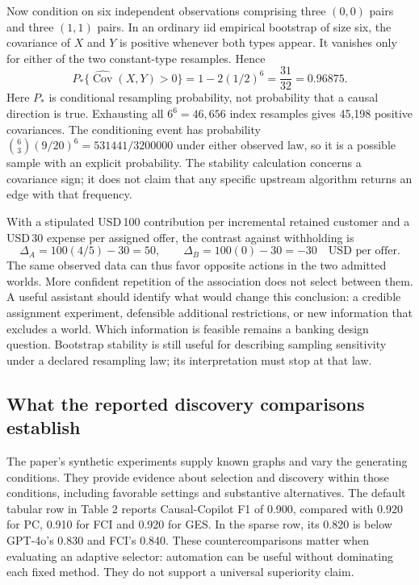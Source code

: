 Now condition on six independent observations comprising three $(0,0)$ pairs
and three $(1,1)$ pairs. In an ordinary iid empirical bootstrap of size six,
the covariance of $X$ and $Y$ is positive whenever both types appear.
It vanishes only for either of the two constant-type resamples. Hence
\begin{equation}
 P_*\{\widehat{\operatorname{Cov}}(X,Y)>0\}
 =1-2(1/2)^6=\frac{31}{32}=0.96875.
 \label{exec17:copilot-stability}
\end{equation}
Here $P_*$ is conditional resampling probability, not probability that a causal
direction is true. Exhausting all $6^6=46{,}656$ index resamples gives 45,198
positive covariances. The conditioning event has probability
$\binom63(9/20)^6=531441/3200000$ under either observed law, so it is a possible
sample with an explicit probability. The stability calculation concerns a
covariance sign; it does not claim that any specific upstream algorithm returns
an edge with that frequency.~\citep{exec17_copilot_exact}

With a stipulated USD\,100 contribution per incremental retained customer and
a USD\,30 expense per assigned offer, the contrast against withholding is
\begin{equation}
 \Delta_A=100(4/5)-30=50,\qquad
 \Delta_B=100(0)-30=-30\quad\text{USD per offer}.
 \label{exec17:copilot-value}
\end{equation}
The same observed data can thus favor opposite actions in the two admitted
worlds. More confident repetition of the association does not select between
them. A useful assistant should identify what would change this conclusion:
a credible assignment experiment, defensible additional restrictions, or new
information that excludes a world. Which information is feasible remains a
banking design question. Bootstrap stability is still useful for describing
sampling sensitivity under a declared resampling law; its interpretation must
stop at that law.~\citep{exec17_copilot_exact}

\subsection{What the reported discovery comparisons establish}

The paper's synthetic experiments supply known graphs and vary the generating
conditions. They provide evidence about selection and discovery within those
conditions, including favorable settings and substantive alternatives. The
default tabular row in Table 2 reports Causal-Copilot F1 of 0.900, compared with
0.920 for PC, 0.910 for FCI and 0.920 for GES. In the sparse row, its 0.820 is
below GPT-4o's 0.830 and FCI's 0.840. These countercomparisons matter when
evaluating an adaptive selector: automation can be useful without dominating
each fixed method. They do not support a universal superiority claim.
\citep{exec17_copilot_paper}

